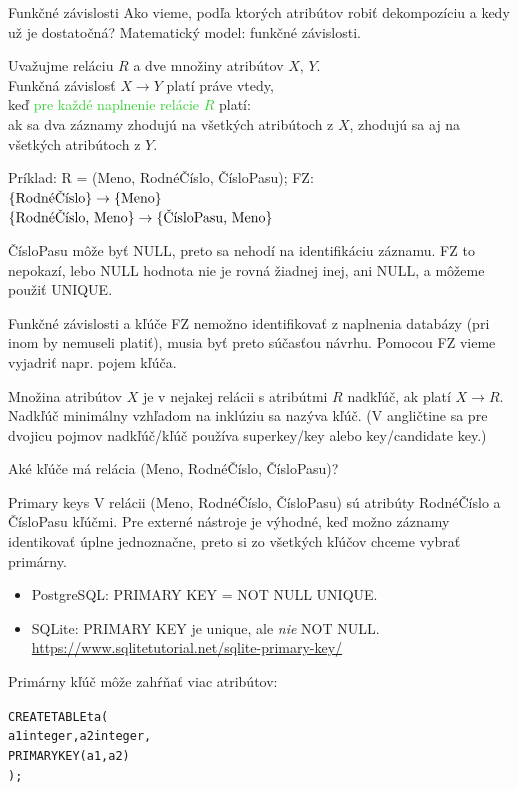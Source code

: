 \documentclass[12pt]{beamer}
\def\blue#1{\textcolor{Cerulean}{#1}}
\def\green#1{\textcolor{LimeGreen}{#1}}
\begin{document}
\let\fz\rightarrow

\begin{frame}[fragile]{Funkčné závislosti}
Ako vieme, podľa ktorých atribútov robiť dekompozíciu a kedy už je dostatočná?
Matematický model: funkčné závislosti.
\bigskip

Uvažujme reláciu $R$ a dve množiny atribútov $X$, $Y$.\\
\alert{Funkčná závislosť} $X\fz Y$ platí práve vtedy,\\
keď \green{pre každé naplnenie relácie $R$} platí:\\
\blue{ak sa dva záznamy zhodujú na všetkých atribútoch z $X$, zhodujú sa aj na všetkých atribútoch z $Y$}.
\bigskip

Príklad: R = (Meno, RodnéČíslo, ČísloPasu); FZ:\\
$\{\hbox{RodnéČíslo}\}\fz \{\hbox{Meno}\}$\\
$\{\hbox{RodnéČíslo, Meno}\}\fz \{\hbox{ČísloPasu, Meno}\}$

{\scriptsize ČísloPasu môže byť NULL, preto sa nehodí na identifikáciu záznamu.
FZ to nepokazí, lebo NULL hodnota nie je rovná žiadnej inej, ani NULL, a môžeme použiť UNIQUE.}
\end{frame}

\begin{frame}[fragile]{Funkčné závislosti a kľúče}
FZ nemožno identifikovať z naplnenia databázy (pri inom by nemuseli platiť), musia byť preto súčasťou návrhu.
Pomocou FZ vieme vyjadriť napr. pojem kľúča.
\bigskip

Množina atribútov $X$ je v nejakej relácii s atribútmi $R$ \alert{nadkľúč}, ak platí $X\fz R$.
Nadkľúč minimálny vzhľadom na inklúziu sa nazýva \alert{kľúč}.
(V angličtine sa pre dvojicu pojmov nadkľúč/kľúč používa superkey/key alebo key/candidate key.)
\bigskip

Aké kľúče má relácia (Meno, RodnéČíslo, ČísloPasu)?
\end{frame}

\begin{frame}[fragile]{Primary keys}
V relácii (Meno, RodnéČíslo, ČísloPasu) sú atribúty RodnéČíslo a ČísloPasu kľúčmi.
Pre externé nástroje je výhodné, keď možno záznamy identikovať úplne jednoznačne,
preto si zo všetkých kľúčov chceme vybrať primárny.
\begin{itemize}
\item PostgreSQL: \alert{PRIMARY KEY} = NOT NULL UNIQUE.
\item SQLite: PRIMARY KEY je unique, ale \emph{nie} NOT NULL.\\
      {\scriptsize \url{https://www.sqlitetutorial.net/sqlite-primary-key/}}
\end{itemize}

\bigskip
Primárny kľúč môže zahŕňať viac atribútov:
\begin{alltt}
CREATE TABLE ta (
  a1 integer, a2 integer,
  \alert{PRIMARY KEY (a1, a2)}
);
\end{alltt}
\end{frame}
\end{document}
